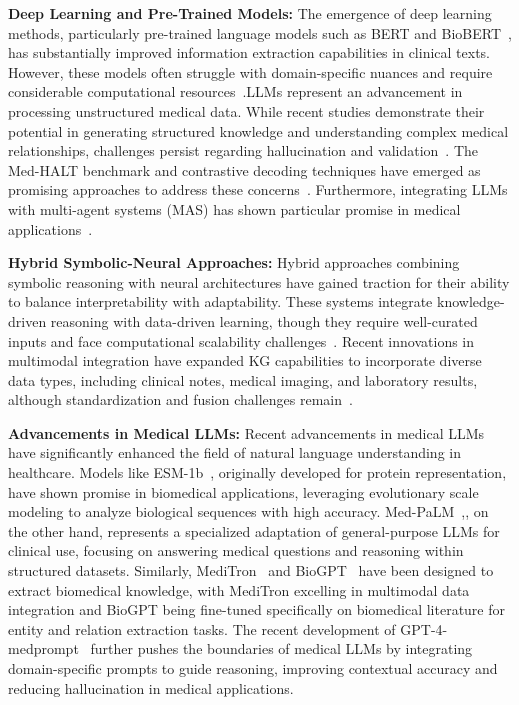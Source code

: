 \documentclass[letterpaper]{article} %
\begin{document}
\textbf{Deep Learning and Pre-Trained Models:} 
The emergence of deep learning methods, particularly pre-trained language models such as BERT and BioBERT~\cite{masoumi2024natural}, has substantially improved information extraction capabilities in clinical texts. However, these models often struggle with domain-specific nuances and require considerable computational resources~\cite{alsentzer2019}.LLMs represent an advancement in processing unstructured medical data. While recent studies demonstrate their potential in generating structured knowledge and understanding complex medical relationships, challenges persist regarding hallucination and validation~\cite{brown2020}. The Med-HALT benchmark and contrastive decoding techniques have emerged as promising approaches to address these concerns~\cite{liu2023}. Furthermore, integrating LLMs with multi-agent systems (MAS) has shown particular promise in medical applications~\cite{singhal2023}.

\textbf{Hybrid Symbolic-Neural Approaches:} 
Hybrid approaches combining symbolic reasoning with neural architectures have gained traction for their ability to balance interpretability with adaptability. These systems integrate knowledge-driven reasoning with data-driven learning, though they require well-curated inputs and face computational scalability challenges~\cite{wu2023}. Recent innovations in multimodal integration have expanded KG capabilities to incorporate diverse data types, including clinical notes, medical imaging, and laboratory results, although standardization and fusion challenges remain~\cite{zhou2022}.

\textbf{Advancements in Medical LLMs:}
Recent advancements in medical LLMs have significantly enhanced the field of natural language understanding in healthcare. Models like ESM-1b~\cite{rives2021biological}, originally developed for protein representation, have shown promise in biomedical applications, leveraging evolutionary scale modeling to analyze biological sequences with high accuracy. Med-PaLM~\cite{singhal2023large},, on the other hand, represents a specialized adaptation of general-purpose LLMs for clinical use, focusing on answering medical questions and reasoning within structured datasets. Similarly, MediTron~\cite{bosselut2024meditron} and BioGPT~\cite{luo2022biogpt} have been designed to extract biomedical knowledge, with MediTron excelling in multimodal data integration and BioGPT being fine-tuned specifically on biomedical literature for entity and relation extraction tasks. The recent development of GPT-4-medprompt~\cite{nori2023can} further pushes the boundaries of medical LLMs by integrating domain-specific prompts to guide reasoning, improving contextual accuracy and reducing hallucination in medical applications.
\end{document}
